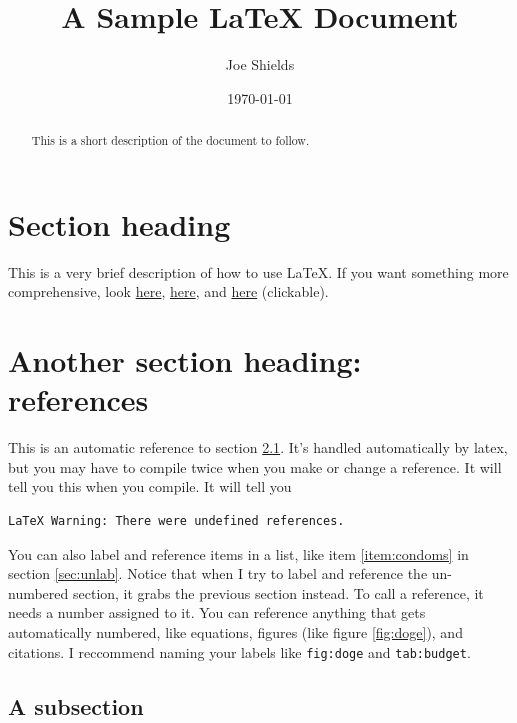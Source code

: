 \documentclass{article}
\title{A Sample \LaTeX{} Document}
\author{Joe Shields}
\date{\today}
\begin{document}
\maketitle
\tableofcontents

\begin{abstract}
This is a short description of the document to follow.
\end{abstract}

\section{Section heading}
This is a very brief description of how to use \LaTeX. If you want something more comprehensive, look 
\href{https://www.tug.org/tug2014/latexclass-sample.pdf}{here}, \href{https://www.tug.org/tug2014/latexclass-sample.tex}{here}, and \href{https://en.wikibooks.org/wiki/LaTeX}{here} (clickable).

\section{Another section heading: references}
This is an automatic reference to section \ref{sec:subsec}. It's handled automatically by latex, but you may have to compile twice when you make or change a reference. It will tell you this when you compile. It will tell you
\begin{verbatim}
LaTeX Warning: There were undefined references.
\end{verbatim}
You can also label and reference items in a list, like item \ref{item:condoms} in section \ref{sec:unlab}. Notice that when I try to label and reference the un-numbered section, it grabs the previous section instead. To call a reference, it needs a number assigned to it. 
You can reference anything that gets automatically numbered, like equations, figures (like figure \ref{fig:doge}), and citations\cite{bergman2011}. I reccommend naming your labels like \texttt{fig:doge} and \texttt{tab:budget}.
\subsection{A subsection}\label{sec:subsec}
\end{document}
